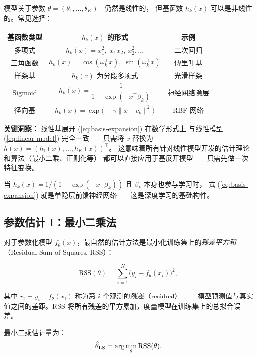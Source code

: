 模型关于参数 $\theta = (\theta_1, \dots, \theta_K)^\top$ 仍然是线性的，
但基函数 $h_k(x)$ 可以是非线性的。常见选择：

\begin{center}
\renewcommand{\arraystretch}{1.4}
\begin{tabular}{c|c|c}
\toprule
\textbf{基函数类型} & \textbf{$h_k(x)$ 的形式} & \textbf{示例} \\
\midrule
多项式   & $h_k(x) = x_1^2,\; x_1x_2,\; x_2^2, \dots$ & 二次回归 \\
三角函数 & $h_k(x) = \cos(\omega_k^\top x),\; \sin(\omega_k^\top x)$ & 傅里叶基 \\
样条基   & $h_k(x)$ 为分段多项式 & 光滑样条 \\
Sigmoid  & $h_k(x) = \dfrac{1}{1 + \exp(-x^\top \beta_k)}$ & 神经网络隐层 \\
径向基   & $h_k(x) = \exp\big(-\gamma \|x - c_k\|^2\big)$ & RBF 网络 \\
\bottomrule
\end{tabular}
\end{center}

\textbf{关键洞察：} 线性基展开 (\ref{eq:basis-expansion}) 在数学形式上
与线性模型 (\ref{eq:linear-model}) 完全一致——只需将 $x$ 替换为 $h(x) = (h_1(x), \dots, h_K(x))^\top$。
这意味着所有针对线性模型开发的估计理论和算法（最小二乘、正则化等）
都可以直接应用于基展开模型——只需先做一次特征变换。

当 $h_k(x) = 1/(1 + \exp(-x^\top \beta_k))$ 且 $\beta_k$ 本身也参与学习时，
式 (\ref{eq:basis-expansion}) 就是单隐层前馈神经网络——这是深度学习的基础构件。

\subsection{参数估计 I：最小二乘法}

对于参数化模型 $f_\theta(x)$，最自然的估计方法是最小化训练集上的\emph{残差平方和}（Residual Sum of Squares, RSS）：

\begin{equation}\label{eq:rss}
    \mathrm{RSS}(\theta) = \sum_{i=1}^{N} \big(y_i - f_\theta(x_i)\big)^2,
\end{equation}

其中 $r_i = y_i - f_\theta(x_i)$ 称为第 $i$ 个观测的\emph{残差}（residual）——
模型预测值与真实值之间的差距。RSS 将所有残差的平方累加，度量模型在训练集上的总拟合误差。

最小二乘估计量为：
\begin{equation}
    \hat{\theta}_{\mathrm{LS}} = \arg\min_\theta \mathrm{RSS}(\theta).
\end{equation}

